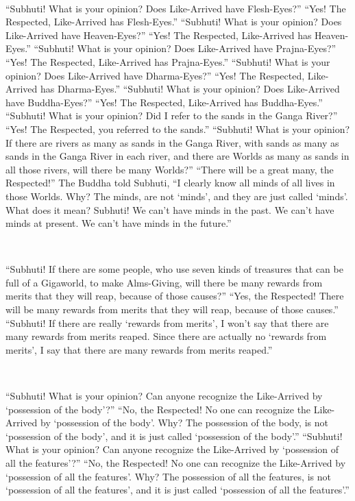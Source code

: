 \documentclass[a5paper,12pt]{book}
\begin{document}
    ~

     ``Subhuti! What is your opinion? Does Like-Arrived have Flesh-Eyes?'' ``Yes! The Respected, Like-Arrived has Flesh-Eyes.'' ``Subhuti! What is your opinion? Does Like-Arrived have Heaven-Eyes?'' ``Yes! The Respected, Like-Arrived has Heaven-Eyes.'' ``Subhuti! What is your opinion? Does Like-Arrived have Prajna-Eyes?'' ``Yes! The Respected, Like-Arrived has Prajna-Eyes.'' ``Subhuti! What is your opinion? Does Like-Arrived have Dharma-Eyes?'' ``Yes! The Respected, Like-Arrived has Dharma-Eyes.'' ``Subhuti! What is your opinion? Does Like-Arrived have Buddha-Eyes?'' ``Yes! The Respected, Like-Arrived has Buddha-Eyes.'' ``Subhuti! What is your opinion? Did I refer to the sands in the Ganga River?'' ``Yes! The Respected, you referred to the sands.'' ``Subhuti! What is your opinion? If there are rivers as many as sands in the Ganga River, with sands as many as sands in the Ganga River in each river, and there are Worlds as many as sands in all those rivers, will there be many Worlds?'' ``There will be a great many, the Respected!'' The Buddha told Subhuti, ``I clearly know all minds of all lives in those Worlds. Why? The minds, are not `minds', and they are just called `minds'. What does it mean? Subhuti! We can't have minds in the past. We can't have minds at present. We can't have minds in the future.''

    ~

     ``Subhuti! If there are some people, who use seven kinds of treasures that can be full of a Gigaworld, to make Alms-Giving, will there be many rewards from merits that they will reap, because of those causes?'' ``Yes, the Respected! There will be many rewards from merits that they will reap, because of those causes.'' ``Subhuti! If there are really `rewards from merits', I won't say that there are many rewards from merits reaped. Since there are actually no `rewards from merits', I say that there are many rewards from merits reaped.''

    ~

     ``Subhuti! What is your opinion? Can anyone recognize the Like-Arrived by `possession of the body'?'' ``No, the Respected! No one can recognize the Like-Arrived by `possession of the body'. Why? The possession of the body, is not `possession of the body', and it is just called `possession of the body'.'' ``Subhuti! What is your opinion? Can anyone recognize the Like-Arrived by `possession of all the features'?'' ``No, the Respected! No one can recognize the Like-Arrived by `possession of all the features'. Why? The possession of all the features, is not `possession of all the features', and it is just called `possession of all the features'.''
\end{document}
